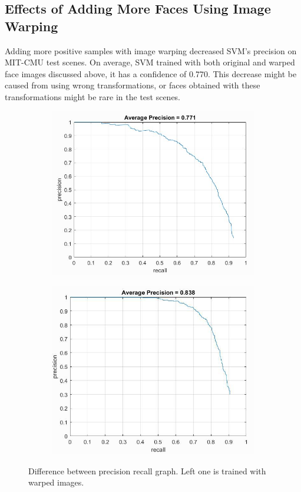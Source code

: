 \documentclass{article}
\begin{document}
\subsection{Effects of Adding More Faces Using Image Warping}

Adding more positive samples with image warping decreased SVM's precision on MIT-CMU test scenes. On average, SVM trained with both original and warped face images discussed above, it has a confidence of 0.770. This decrease might be caused from using wrong transformations, or faces obtained with these transformations might be rare in the test scenes. 

\begin{figure}[!htb]
\begin{subfigure}{.48\textwidth}
  \centering
  \includegraphics[width=.99\textwidth]{warped.jpg}
\end{subfigure}
\begin{subfigure}{.48\textwidth}
  \centering
  \includegraphics[width=.99\textwidth]{nowarp.jpg}
\end{subfigure}
\caption{Difference between precision recall graph. Left one is trained with warped images.}
\end{figure}
\end{document}
